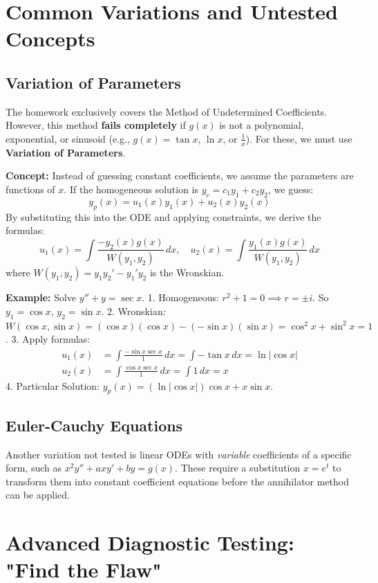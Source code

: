 \documentclass[11pt, a4paper]{article}
\theoremstyle{definition}
\theoremstyle{remark}
\begin{document}
\newpage
\section{Common Variations and Untested Concepts}

\subsection{Variation of Parameters}
The homework exclusively covers the Method of Undetermined Coefficients. However, this method \textbf{fails completely} if $g(x)$ is not a polynomial, exponential, or sinusoid (e.g., $g(x) = \tan x$, $\ln x$, or $\frac{1}{x}$). For these, we must use \textbf{Variation of Parameters}.

\textbf{Concept:} Instead of guessing constant coefficients, we assume the parameters are functions of $x$. If the homogeneous solution is $y_c = c_1 y_1 + c_2 y_2$, we guess:
\[
y_p(x) = u_1(x) y_1(x) + u_2(x) y_2(x)
\]
By substituting this into the ODE and applying constraints, we derive the formulas:
\[
u_1(x) = \int \frac{-y_2(x) g(x)}{W(y_1, y_2)} \, dx, \quad u_2(x) = \int \frac{y_1(x) g(x)}{W(y_1, y_2)} \, dx
\]
where $W(y_1, y_2) = y_1 y_2' - y_1' y_2$ is the Wronskian.

\textbf{Example:} Solve $y'' + y = \sec x$.
1. Homogeneous: $r^2 + 1 = 0 \implies r = \pm i$. So $y_1 = \cos x$, $y_2 = \sin x$.
2. Wronskian: $W(\cos x, \sin x) = (\cos x)(\cos x) - (-\sin x)(\sin x) = \cos^2 x + \sin^2 x = 1$.
3. Apply formulas:
\begin{align*}
u_1(x) &= \int \frac{-\sin x \sec x}{1} \, dx = \int -\tan x \, dx = \ln|\cos x| \\
u_2(x) &= \int \frac{\cos x \sec x}{1} \, dx = \int 1 \, dx = x
\end{align*}
4. Particular Solution: $y_p(x) = (\ln|\cos x|)\cos x + x \sin x$.

\subsection{Euler-Cauchy Equations}
Another variation not tested is linear ODEs with \textit{variable} coefficients of a specific form, such as $x^2 y'' + a x y' + b y = g(x)$. These require a substitution $x = e^t$ to transform them into constant coefficient equations before the annihilator method can be applied.

\newpage
\section{Advanced Diagnostic Testing: "Find the Flaw"}
\end{document}

